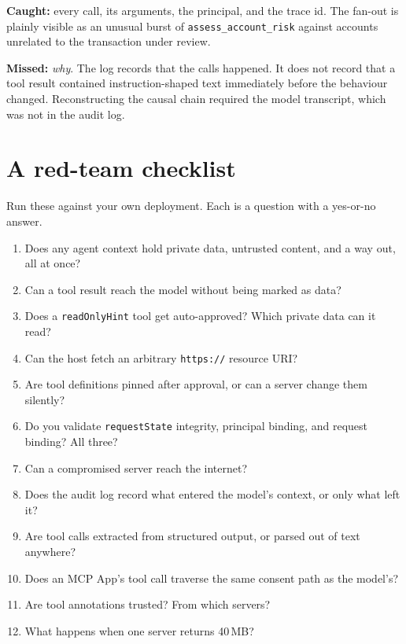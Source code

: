 \textbf{Caught:} every call, its arguments, the principal, and the trace id. The
fan-out is plainly visible as an unusual burst of \texttt{assess\_account\_risk}
against accounts unrelated to the transaction under review.

\textbf{Missed:} \emph{why}. The log records that the calls happened. It does not
record that a tool result contained instruction-shaped text immediately before
the behaviour changed. Reconstructing the causal chain required the model
transcript, which was not in the audit log.


\section{A red-team checklist}

Run these against your own deployment. Each is a question with a yes-or-no
answer.

\begin{enumerate}[leftmargin=1.6em, itemsep=3pt]
\item Does any agent context hold private data, untrusted content, and a way out,
all at once?
\item Can a tool result reach the model without being marked as data?
\item Does a \texttt{readOnlyHint} tool get auto-approved? Which private data can
it read?
\item Can the host fetch an arbitrary \texttt{https://} resource URI?
\item Are tool definitions pinned after approval, or can a server change them
silently?
\item Do you validate \texttt{requestState} integrity, principal binding, and
request binding? All three?
\item Can a compromised server reach the internet?
\item Does the audit log record what entered the model's context, or only what
left it?
\item Are tool calls extracted from structured output, or parsed out of text
anywhere?
\item Does an MCP App's tool call traverse the same consent path as the model's?
\item Are tool annotations trusted? From which servers?
\item What happens when one server returns 40\,MB?
\end{enumerate}

